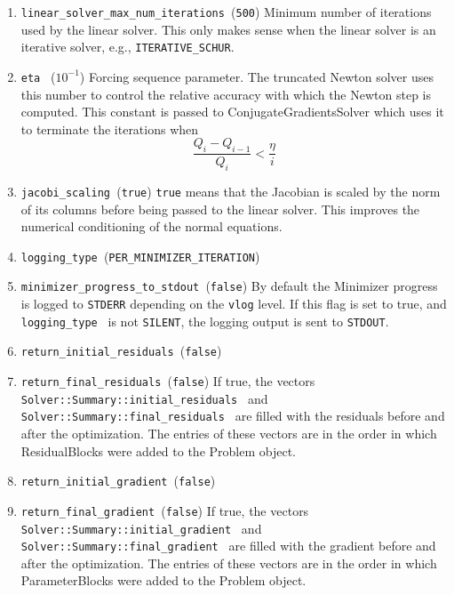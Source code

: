\begin{enumerate}
\item{\texttt{linear\_solver\_max\_num\_iterations }}(\texttt{500}) Minimum number of iterations used by the linear solver. This only makes sense when the linear solver is an iterative solver, e.g., \texttt{ITERATIVE\_SCHUR}.

\item{\texttt{eta }} ($10^{-1}$)
 Forcing sequence parameter. The truncated Newton solver uses
    this number to control the relative accuracy with which the
     Newton step is computed. This constant is passed to ConjugateGradientsSolver which uses
     it to terminate the iterations when
\begin{equation}
      \frac{Q_i - Q_{i-1}}{Q_i} < \frac{\eta}{i}
\end{equation}

\item{\texttt{jacobi\_scaling }}(\texttt{true}) \texttt{true} means that the Jacobian is scaled by the norm of its columns before being passed to the linear solver. This improves the numerical conditioning of the normal equations.

\item{\texttt{logging\_type }}(\texttt{PER\_MINIMIZER\_ITERATION})


\item{\texttt{minimizer\_progress\_to\_stdout }}(\texttt{false})
By default the Minimizer progress is logged to \texttt{STDERR} depending on the \texttt{vlog} level. If this flag is
set to true, and \texttt{logging\_type } is not \texttt{SILENT}, the logging output
is sent to \texttt{STDOUT}.

\item{\texttt{return\_initial\_residuals }}(\texttt{false})
\item{\texttt{return\_final\_residuals }}(\texttt{false})
If true, the vectors \texttt{Solver::Summary::initial\_residuals } and \texttt{Solver::Summary::final\_residuals } are filled with the residuals before and after the optimization. The entries of these vectors are in the order in which ResidualBlocks were added to the Problem object.

\item{\texttt{return\_initial\_gradient }}(\texttt{false})
\item{\texttt{return\_final\_gradient }}(\texttt{false})
If true, the vectors \texttt{Solver::Summary::initial\_gradient } and \texttt{Solver::Summary::final\_gradient } are filled with the gradient before and after the optimization. The entries of these vectors are in the order in which ParameterBlocks were added to the Problem object.


\end{enumerate}
